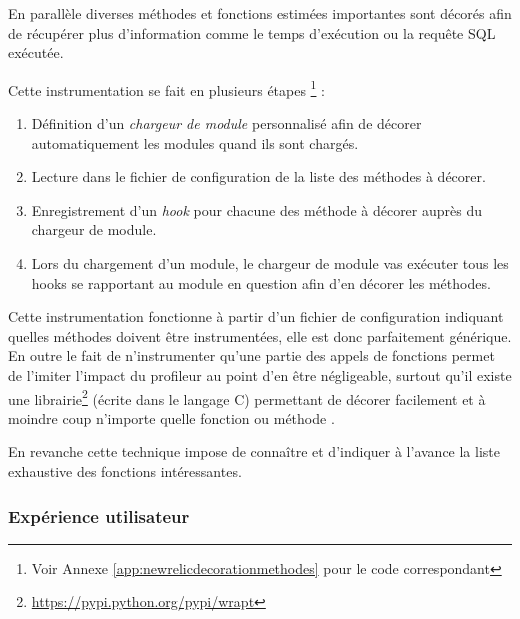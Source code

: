 En parallèle diverses méthodes et fonctions estimées importantes sont décorés afin de récupérer plus d'information comme le temps d'exécution ou la requête SQL exécutée.

Cette instrumentation se fait en plusieurs étapes \footnote{Voir Annexe \vref{app:newrelicdecorationmethodes} pour le code correspondant} :
\begin{enumerate}
  \item Définition d'un \emph{\gls{chargeur de module}} personnalisé afin de décorer automatiquement les modules quand ils sont chargés.
  \item Lecture dans le fichier de configuration de la liste des méthodes à décorer.
  \item Enregistrement d'un \emph{\gls{hook}} pour chacune des méthode à décorer auprès du chargeur de module.
  \item Lors du chargement d'un module, le chargeur de module vas exécuter tous les hooks se rapportant au module en question afin d'en décorer les méthodes.
\end{enumerate}

Cette instrumentation fonctionne à partir d'un fichier de configuration indiquant quelles méthodes doivent être instrumentées, elle est donc parfaitement générique. En outre le fait de n'instrumenter qu'une partie des appels de fonctions permet de l'imiter l'impact du profileur au point d'en être négligeable, surtout qu'il existe une librairie\footnote{\url{https://pypi.python.org/pypi/wrapt}} (écrite dans le langage C) permettant de décorer facilement et à moindre coup n'importe quelle fonction ou méthode \Python.

En revanche cette technique impose de connaître et d'indiquer à l'avance la liste exhaustive des fonctions intéressantes.

  \subsubsection{Expérience utilisateur}
